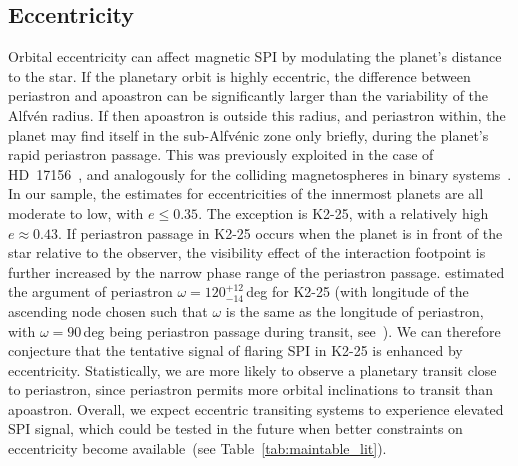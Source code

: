 \documentclass[twocolumn]{aastex631}
\begin{document}
\subsection{Eccentricity}
\label{sec:discussion:eccentricity}
Orbital eccentricity can affect magnetic SPI by modulating the planet's distance to the star. If the planetary orbit is highly eccentric, the difference between periastron and apoastron can be significantly larger than the variability of the Alfv\'en radius. If then apoastron is outside this radius, and periastron within, the planet may find itself in the sub-Alfv\'enic zone only briefly, during the planet's rapid periastron passage. This was previously exploited in the case of HD~17156~\citep{maggio2015coordinated}, and analogously for the colliding magnetospheres in binary systems~\citep{massi2002periodic,getman2016search,das2023discovery}. In our sample, the estimates for eccentricities of the innermost planets are all moderate to low, with $e\leq 0.35$. The exception is K2-25, with a relatively high $e\approx0.43$. If periastron passage in K2-25 occurs when the planet is in front of the star relative to the observer, the visibility effect of the interaction footpoint is further increased by the narrow phase range of the periastron passage. \citet{stefansson2020habitable} estimated the argument of periastron $\omega=120^{+12}_{-14}\,$deg for K2-25 (with longitude of the ascending node chosen such that $\omega$ is the same as the longitude of periastron, with $\omega=90\,$deg being periastron passage during transit, see~\citealt{kipping2010investigations,dawson2012photoeccentric}). We can therefore conjecture that the tentative signal of flaring SPI in K2-25 is enhanced by eccentricity. Statistically, we are more likely to observe a planetary transit close to periastron, since periastron permits more orbital inclinations to transit than apoastron. Overall, we expect eccentric transiting systems to experience elevated SPI signal, which could be tested in the future when better constraints on eccentricity become available~(see Table~\ref{tab:maintable_lit}).

\end{document}
